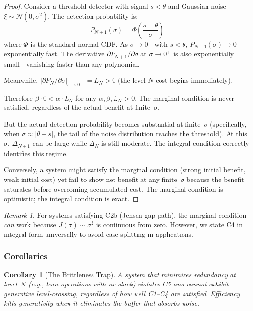 \documentclass[12pt,letterpaper]{article}
\newtheorem{corollary}[theorem]{Corollary}
\theoremstyle{definition}
\theoremstyle{remark}
\newtheorem{remark}[theorem]{Remark}
\newcommand{\Pn}{P_N}
\newcommand{\Pnp}{P_{N+1}}
\begin{document}
\begin{proof}
Consider a threshold detector with signal $s < \theta$ and Gaussian noise $\xi \sim \mathcal{N}(0, \sigma^2)$. The detection probability is:
\begin{equation}
\Pnp(\sigma) = \Phi\!\left(\frac{s - \theta}{\sigma}\right)
\end{equation}
where $\Phi$ is the standard normal CDF\@. As $\sigma \to 0^+$ with $s < \theta$, $\Pnp(\sigma) \to 0$ exponentially fast. The derivative $\partial \Pnp/\partial\sigma$ at $\sigma \to 0^+$ is also exponentially small---vanishing faster than any polynomial.

Meanwhile, $|\partial \Pn/\partial\sigma|_{\sigma \to 0^+}| = L_N > 0$ (the level-$N$ cost begins immediately).

Therefore $\beta \cdot 0 < \alpha \cdot L_N$ for any $\alpha, \beta, L_N > 0$. The marginal condition is never satisfied, regardless of the actual benefit at finite~$\sigma$.

But the actual detection probability becomes substantial at finite~$\sigma$ (specifically, when $\sigma \approx |\theta - s|$, the tail of the noise distribution reaches the threshold). At this~$\sigma$, $\Delta_{N+1}$ can be large while $\Delta_N$ is still moderate. The integral condition correctly identifies this regime.

Conversely, a system might satisfy the marginal condition (strong initial benefit, weak initial cost) yet fail to show net benefit at any finite~$\sigma$ because the benefit saturates before overcoming accumulated cost. The marginal condition is optimistic; the integral condition is exact.
\end{proof}

\begin{remark}
For systems satisfying C2b (Jensen gap path), the marginal condition \emph{can} work because $J(\sigma) \sim \sigma^2$ is continuous from zero. However, we state C4 in integral form universally to avoid case-splitting in applications.
\end{remark}


\subsubsection{Corollaries}

\begin{corollary}[The Brittleness Trap]
\label{cor:brittleness}
A system that minimizes redundancy at level~$N$ (e.g., lean operations with no slack) violates C5 and cannot exhibit generative level-crossing, regardless of how well C1--C4 are satisfied. Efficiency kills generativity when it eliminates the buffer that absorbs noise.
\end{corollary}
\end{document}
